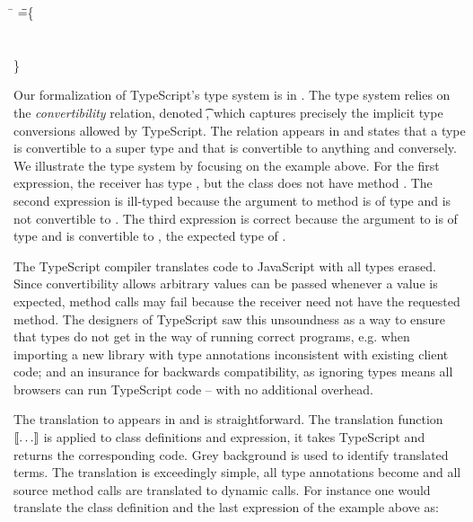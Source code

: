 \documentclass[acmsmall, anonymous, authordraft, review]{acmart} %
\begin{document}
{\small
\begin{tabbing}
  \hspace{.5cm}
   \=  \Call{\New\C{}}\n{\New\D{}} \HS\HS\HS\HS\HS\HS\HS\HS\HS\HS\HS\HS\HS\HS\WHERE\HS \K\HS =\HS\= \class\= \C \{\\
   \> \Call{\New\C{}}\m{\New\C{}}                                  \>  \HS  \Mdef\m\x\D\C{~\this~} \\
   \> \Call{\New\C{}}\m{\Call{\New\C{}}\mp{\New\C{}}}              \>  \HS  \Mdef\mp\x\any\D{~\x~}\\
   \>                                                              \>  \}   \\
   \>                                                              \> \Class\D{}{}
\end{tabbing}}


\noindent
Our formalization of TypeScript's type system is in
. The type system relies on the \emph{convertibility}
relation, denoted \ConvertE{}\t\tp, which captures precisely the implicit
type conversions allowed by TypeScript.  The relation appears in
 and states that a type is convertible to a super type and
that \any is convertible to anything and conversely. We illustrate the type
system by focusing on the example above. For the first expression, the
receiver has type \C, but the class does not have method \n. The second
expression is ill-typed because the argument to method \m is of type \C and
\C is not convertible to \D. The third expression is correct because the
argument to \mp is of type \C and \C is convertible to \any, the expected
type of \mp.

The TypeScript compiler translates code to JavaScript with all types erased.
Since convertibility allows arbitrary values can be passed whenever a \any
value is expected, method calls may fail because the receiver need not have
the requested method. The designers of TypeScript saw this unsoundness as a
way to ensure that types do not get in the way of running correct programs,
e.g. when importing a new library with type annotations inconsistent with
existing client code; and an insurance for backwards compatibility, as
ignoring types means all browsers can run TypeScript code -- with no
additional overhead.

The translation to \kafka appears in  and is straightforward.
The translation function \(\llbracket \dots \rrbracket\) is applied to class definitions and
expression, it takes TypeScript and returns the corresponding \kafka
code. Grey background is used to identify translated terms. The translation
is exceedingly simple, all type annotations become \any and all source
method calls are translated to dynamic \kafka calls.  For instance one would
translate the class definition and the last expression of the example above as:
\end{document}
